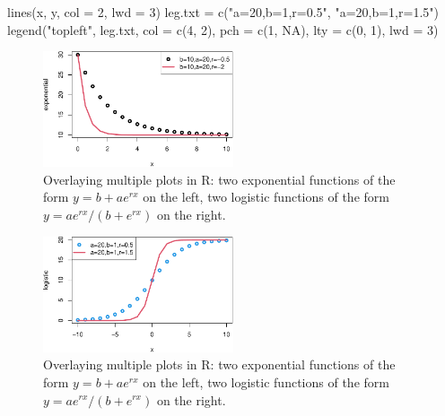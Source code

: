 \documentclass[
  letterpaper,
  DIV=11,
  numbers=noendperiod]{scrreprt}
\newenvironment{Shaded}{\begin{snugshade}}{\end{snugshade}}
\newcommand{\AttributeTok}[1]{\textcolor[rgb]{0.40,0.45,0.13}{#1}}
\newcommand{\ConstantTok}[1]{\textcolor[rgb]{0.56,0.35,0.01}{#1}}
\newcommand{\DecValTok}[1]{\textcolor[rgb]{0.68,0.00,0.00}{#1}}
\newcommand{\FunctionTok}[1]{\textcolor[rgb]{0.28,0.35,0.67}{#1}}
\newcommand{\NormalTok}[1]{\textcolor[rgb]{0.00,0.23,0.31}{#1}}
\newcommand{\OtherTok}[1]{\textcolor[rgb]{0.00,0.23,0.31}{#1}}
\newcommand{\StringTok}[1]{\textcolor[rgb]{0.13,0.47,0.30}{#1}}
\begin{document}
\begin{Shaded}
\begin{Highlighting}[]
\FunctionTok{lines}\NormalTok{(x, y, }\AttributeTok{col =} \DecValTok{2}\NormalTok{, }\AttributeTok{lwd =} \DecValTok{3}\NormalTok{)}
\NormalTok{leg.txt }\OtherTok{=} \FunctionTok{c}\NormalTok{(}\StringTok{"a=20,b=1,r=0.5"}\NormalTok{, }\StringTok{"a=20,b=1,r=1.5"}\NormalTok{)}
\FunctionTok{legend}\NormalTok{(}\StringTok{"topleft"}\NormalTok{, leg.txt, }\AttributeTok{col =} \FunctionTok{c}\NormalTok{(}\DecValTok{4}\NormalTok{, }\DecValTok{2}\NormalTok{), }\AttributeTok{pch =} \FunctionTok{c}\NormalTok{(}\DecValTok{1}\NormalTok{, }\ConstantTok{NA}\NormalTok{), }\AttributeTok{lty =} \FunctionTok{c}\NormalTok{(}\DecValTok{0}\NormalTok{, }\DecValTok{1}\NormalTok{), }\AttributeTok{lwd =} \DecValTok{3}\NormalTok{)}
\end{Highlighting}
\end{Shaded}

\begin{figure}[H]

{\centering \includegraphics[width=0.5\textwidth,height=\textheight]{./functions_files/figure-pdf/ch2-plot2-1.pdf}

}

\caption{Overlaying multiple plots in R: two exponential functions of
the form \(y=b+ae^{rx}\) on the left, two logistic functions of the form
\(y= ae^{rx}/(b+e^{rx})\) on the right.}

\end{figure}

\begin{figure}[H]

{\centering \includegraphics[width=0.5\textwidth,height=\textheight]{./functions_files/figure-pdf/ch2-plot2-2.pdf}

}

\caption{Overlaying multiple plots in R: two exponential functions of
the form \(y=b+ae^{rx}\) on the left, two logistic functions of the form
\(y= ae^{rx}/(b+e^{rx})\) on the right.}

\end{figure}
\end{document}
